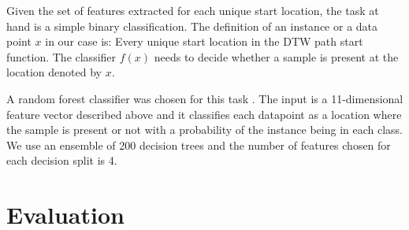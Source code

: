 \documentclass{article}
\begin{document}
Given the set of features extracted for each unique start location, the task at hand is a simple binary classification. The definition of an instance or a data point $x$ in our case is: Every unique start location in the DTW path start function. The classifier $f(x)$ needs to decide whether a sample is present at the location denoted by $x$.

A random forest classifier was chosen for this task \cite{breiman2001random}. The input is a 11-dimensional feature vector described above and it classifies each datapoint as a location where the sample is present or not with a probability of the instance being in each class. We use an ensemble of 200 decision trees and the number of features chosen for each decision split is 4.


\section{Evaluation}
\label{eval}
\end{document}
